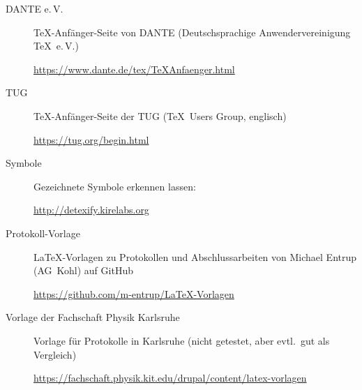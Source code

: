 \begin{frame}[<+->]
	\begin{description}
		\item[DANTE e.\,V.] \TeX-Anfänger-Seite von DANTE (Deutschsprachige Anwendervereinigung \TeX~e.\,V.) 

		\url{https://www.dante.de/tex/TeXAnfaenger.html}
		\item[TUG] \TeX-Anfänger-Seite der TUG (\TeX\ Users Group, englisch) 

		\url{https://tug.org/begin.html}
		\item[Symbole] Gezeichnete Symbole erkennen lassen:

		\url{http://detexify.kirelabs.org}
	\end{description}
	\begin{description}
		\item[Protokoll-Vorlage] \LaTeX-Vorlagen zu Protokollen und Abschlussarbeiten von Michael Entrup (AG~Kohl) auf GitHub

		\url{https://github.com/m-entrup/LaTeX-Vorlagen}
		\item[Vorlage der Fachschaft Physik Karlsruhe] Vorlage für Protokolle in Karlsruhe (nicht getestet, aber evtl.\ gut als Vergleich)

		\url{https://fachschaft.physik.kit.edu/drupal/content/latex-vorlagen}
	\end{description}
\end{frame}

